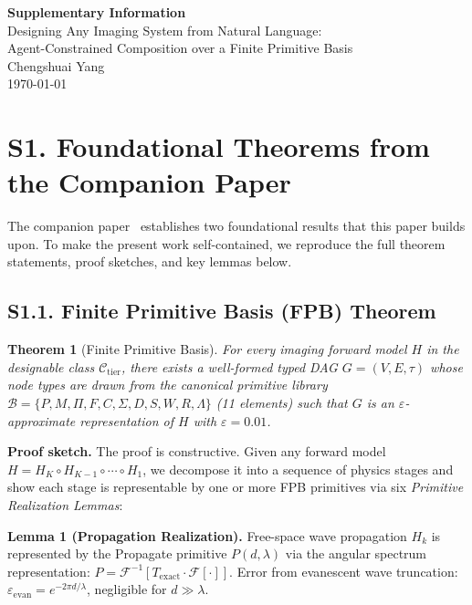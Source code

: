 \documentclass[11pt,a4paper]{article}
\newtheorem{theorem}{Theorem}
\newcommand{\eps}{\varepsilon}
\begin{document}
\begin{center}
{\LARGE\bfseries Supplementary Information}\\[8pt]
{\large Designing Any Imaging System from Natural Language:\\
Agent-Constrained Composition over a Finite Primitive Basis}\\[12pt]
{\normalsize Chengshuai Yang}\\[6pt]
\today
\end{center}

\vspace{12pt}

\section{S1. Foundational Theorems from the Companion Paper}

The companion paper~\cite{paperII} establishes two foundational results that this paper builds upon.  To make the present work self-contained, we reproduce the full theorem statements, proof sketches, and key lemmas below.

\subsection{S1.1. Finite Primitive Basis (FPB) Theorem}

\begin{theorem}[Finite Primitive Basis]
\label{thm:fpb_supp}
For every imaging forward model $H$ in the designable class $\mathcal{C}_{\mathrm{tier}}$, there exists a well-formed typed DAG $G = (V, E, \tau)$ whose node types are drawn from the canonical primitive library $\mathcal{B} = \{P, M, \Pi, F, C, \Sigma, D, S, W, R, \Lambda\}$ (11 elements) such that $G$ is an $\eps$-approximate representation of $H$ with $\eps = 0.01$.
\end{theorem}

\textbf{Proof sketch.}
The proof is constructive.  Given any forward model $H = H_K \circ H_{K-1} \circ \cdots \circ H_1$, we decompose it into a sequence of physics stages and show each stage is representable by one or more FPB primitives via six \emph{Primitive Realization Lemmas}:

\textbf{Lemma 1 (Propagation Realization).}
Free-space wave propagation $H_k$ is represented by the Propagate primitive $P(d, \lambda)$ via the angular spectrum representation: $P = \mathcal{F}^{-1}[T_{\mathrm{exact}} \cdot \mathcal{F}[\cdot]]$.  Error from evanescent wave truncation: $\eps_{\mathrm{evan}} = e^{-2\pi d/\lambda}$, negligible for $d \gg \lambda$.
\end{document}
